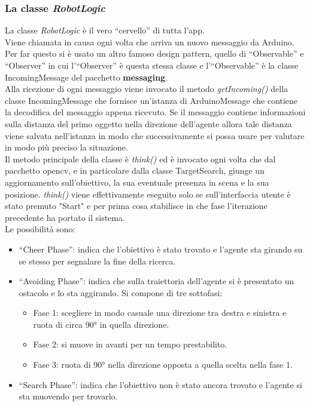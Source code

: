 \subsubsection{La classe \emph{RobotLogic}}
La classe \emph{RobotLogic} è il vero ``cervello'' di tutta l'app.\\
Viene chiamata in causa ogni volta che arriva un nuovo messaggio da Arduino. 
Per far questo si è usato un altro famoso design pattern, quello di ``Observable'' 
e ``Observer'' in cui l'``Observer'' è questa stessa classe e l'``Observable''
è la classe IncomingMessage del pacchetto \textbf{messaging}.\\
Alla ricezione di ogni messaggio viene invocato il metodo \emph{getIncoming()} 
della classe IncomingMessage che fornisce un'istanza di ArduinoMessage che contiene 
la decodifica del messaggio appena ricevuto. Se il messaggio
contiene informazioni sulla distanza del primo oggetto nella direzione dell'agente
allora tale distanza viene salvata nell'istanza in modo che successivamente si
possa usare per valutare in modo più preciso la situazione.\\
Il metodo principale della classe è \emph{think()} ed è invocato ogni volta che
dal pacchetto opencv, e in particolare dalla classe TargetSearch, giunge un aggiornamento
sull'obiettivo, la sua eventuale presenza in scena e la sua posizione. \emph{think()}
viene effettivamente eseguito solo se sull'interfaccia utente è stato premuto "Start"
e per prima cosa stabilisce in che fase l'iterazione precedente ha portato il sistema. \\
Le possibilità sono:
	\begin{itemize}
	\item ``Cheer Phase'': indica che l'obiettivo è stato trovato e l'agente sta
	girando su se stesso per segnalare la fine della ricerca.
	\item ``Avoiding Phase'': indica che sulla traiettoria dell'agente si è presentato un ostacolo e lo sta aggirando. Si compone di tre sottofasi:
	\begin{itemize}
		\item Fase 1: scegliere in modo casuale una direzione tra destra e sinistra e ruota di circa 90° in quella direzione. 
		\item Fase 2: si muove in avanti per un tempo prestabilito.
		\item Fase 3: ruota di 90° nella direzione opposta a quella scelta nella fase 1.
	\end{itemize}
	\item ``Search Phase'': indica che l'obiettivo non è stato ancora trovato e l'agente si sta muovendo per trovarlo.
	\end{itemize}
